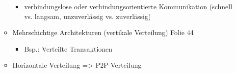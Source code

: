 \begin{itemize}
\begin{itemize}
				\begin{itemize}
					\item verbindungslose oder verbindungsorientierte Kommunikation (schnell vs. langsam, unzuverlässig vs. zuverlässig)
				\end{itemize}
			\item Mehrschichtige Architekturen (vertikale Verteilung) Folie 44
				\begin{itemize}
					\item Bsp.: Verteilte Transaktionen
				\end{itemize}
			\item Horizontale Verteilung => P2P-Verteilung
		\end{itemize}
\end{itemize}
